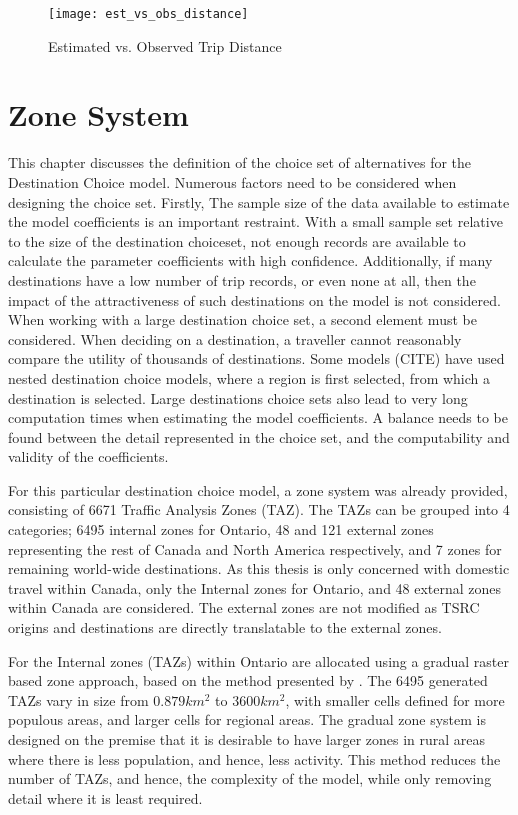 \begin{figure}[H]
\centering
\texttt{[image: est\_vs\_obs\_distance]}
\caption{Estimated vs. Observed Trip Distance}
\label{fig:distance}
\end{figure}

\section{Zone System}
This chapter discusses the definition of the choice set of alternatives for the Destination Choice model. Numerous factors need to be considered when designing the choice set. Firstly, The sample size of the data available to estimate the model coefficients is an important restraint. With a small sample set relative to the size of the destination choiceset, not enough records are available to calculate the parameter coefficients with high confidence. Additionally, if many destinations have a low number of trip records, or even none at all, then the impact of the attractiveness of such destinations on the model is not considered. When working with a large destination choice set, a second element must be considered. When deciding on a destination, a traveller cannot reasonably compare the utility of thousands of destinations. Some models (CITE) have used nested destination choice models, where a region is first selected, from which a destination is selected. Large destinations choice sets also lead to very long computation times when estimating the model coefficients. A balance needs to be found between the detail represented in the choice set, and the computability and validity of the coefficients.

For this particular destination choice model, a zone system was already provided, consisting of 6671 Traffic Analysis Zones (TAZ). The TAZs can be grouped into 4 categories; 6495 internal zones for Ontario, 48 and 121 external zones representing the rest of Canada and North America respectively, and 7 zones for remaining world-wide destinations. As this thesis is only concerned with domestic travel within Canada, only the Internal zones for Ontario, and 48 external zones within Canada are considered. The external zones are not modified as TSRC origins and destinations are directly translatable to the external zones.

For the Internal zones (TAZs) within Ontario are allocated using a gradual raster based zone approach, based on the method presented by \textcite{moeckel2015gradual}. The 6495 generated TAZs vary in size from $0.879 km^2$ to $3600km^2$, with smaller cells defined for more populous areas, and larger cells for regional areas. The gradual zone system is designed on the premise that it is desirable to have larger zones in rural areas where there is less population, and hence, less activity. This method reduces the number of TAZs, and hence, the complexity of the model, while only removing detail where it is least required. 

